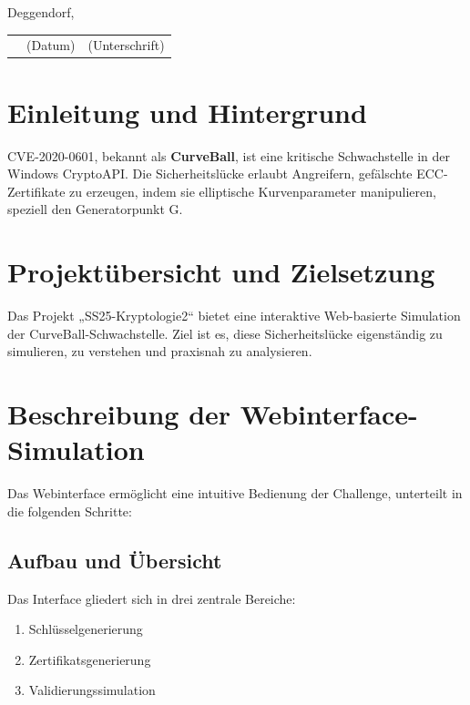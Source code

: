 \documentclass{article}
\begin{document}
\vspace{1cm}
Deggendorf, \underline{\hspace{0.715\textwidth}}\\
\begin{tabular}{lll}
  \hspace{3cm} & \small(Datum)\hspace{1cm} & \hspace{2cm}\small(Unterschrift)
\end{tabular}

\newpage
\tableofcontents
\newpage


\section{Einleitung und Hintergrund}
CVE-2020-0601, bekannt als \textbf{CurveBall}, ist eine kritische Schwachstelle in der Windows CryptoAPI. Die Sicherheitslücke erlaubt Angreifern, gefälschte ECC-Zertifikate zu erzeugen, indem sie elliptische Kurvenparameter manipulieren, speziell den Generatorpunkt G.

\section{Projektübersicht und Zielsetzung}
Das Projekt „SS25-Kryptologie2“ bietet eine interaktive Web-basierte Simulation der CurveBall-Schwachstelle. Ziel ist es, diese Sicherheitslücke eigenständig zu simulieren, zu verstehen und praxisnah zu analysieren.

\section{Beschreibung der Webinterface-Simulation}
Das Webinterface ermöglicht eine intuitive Bedienung der Challenge, unterteilt in die folgenden Schritte:

\subsection{Aufbau und Übersicht}
Das Interface gliedert sich in drei zentrale Bereiche:

\begin{enumerate}
    \item Schlüsselgenerierung
    \item Zertifikatsgenerierung
    \item Validierungssimulation
\end{enumerate}
\end{document}
